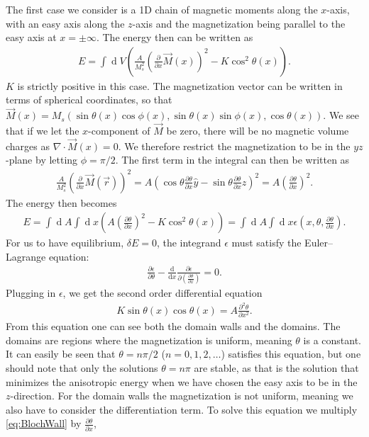 \documentclass[12pt, a4paper]{article}		%
\renewcommand{\d}[1]{\ensuremath{\operatorname{d}\!{#1}}}
\numberwithin{equation}{section}
\begin{document}
The first case we consider is a 1D chain of magnetic moments along the $x$-axis, with an easy axis along the $z$-axis and the magnetization being parallel to the easy axis at $x = \pm \infty$. The energy then can be written as
\begin{align}
\label{eq:BlochEnergy}
E = \int \d V (\frac{A}{M_s^2}(\frac{\partial}{\partial x}\vec{M}(x))^2 - K \cos ^2 \theta (x)).
\end{align}
$K$ is strictly positive in this case. The magnetization vector can be written in terms of spherical coordinates, so that $\vec{M}(x) = M_s (\sin \theta (x) \cos \phi (x), \sin \theta (x) \sin \phi (x), \cos \theta (x))$. We see that if we let the $x$-component of $\vec{M}$ be zero, there will be no magnetic volume charges as $\nabla \cdot \vec{M}(x) = 0$. We therefore restrict the magnetization to be in the $yz$-plane by letting $\phi = \pi/2$. The first term in the integral can then be written as
\begin{align}
\frac{A}{M_s^2}(\frac{\partial}{\partial x}\vec{M}(\vec{r}))^2 = A(\cos\theta \frac{\partial \theta}{\partial x} \hat{y} - \sin\theta \frac{\partial \theta}{\partial x} \hat{z})^2 = A (\frac{\partial \theta}{\partial x})^2.
\end{align}
The energy then becomes
\begin{align}
E = \int \d A \int \d x (A (\frac{\partial \theta}{\partial x})^2- K \cos ^2 \theta (x)) = \int \d A \int \d x \epsilon(x, \theta, \frac{\partial \theta}{\partial x}).
\end{align}
For us to have equilibrium, $\delta E = 0$, the integrand $\epsilon$ must satisfy the Euler--Lagrange equation:
\begin{align}
\frac{\partial \epsilon}{\partial \theta} - \frac{\textrm{d}}{\textrm{d} x} \frac{\partial \epsilon}{\partial (\frac{\partial \theta}{\partial x})} = 0.
\end{align}
Plugging in $\epsilon$, we get the second order differential equation
\begin{align}
\label{eq:BlochWall}
K\sin \theta (x) \cos \theta (x) = A \frac{\partial^2 \theta}{\partial x^2}.
\end{align} 
From this equation one can see both the domain walls and the domains. The domains are regions where the magnetization is uniform, meaning $\theta$ is a constant. It can easily be seen that $\theta = n\pi/2$ ($n = 0, 1, 2, \ldots$) satisfies this equation, but one should note that only the solutions $\theta = n\pi$ are stable, as that is the solution that minimizes the anisotropic energy when we have chosen the easy axis to be in the $z$-direction. For the domain walls the magnetization is not uniform, meaning we also have to consider the differentiation term. To solve this equation we multiply \eqref{eq:BlochWall} by $\frac{\partial \theta}{\partial x}$,
\end{document}
